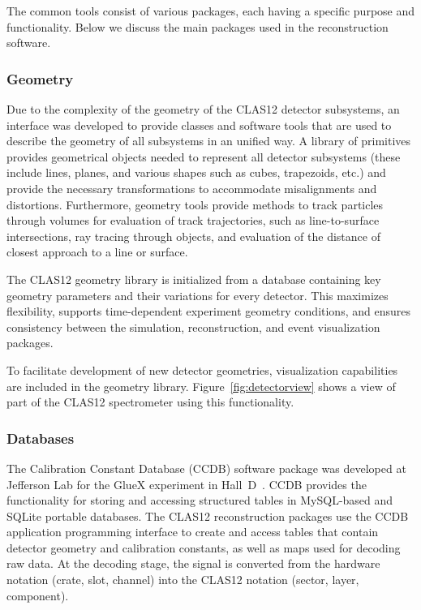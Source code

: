 The common tools consist of various packages, each having a specific purpose and functionality. Below we discuss
the main packages used in the reconstruction software.

\subsubsection{Geometry}

Due to the complexity of the geometry of the CLAS12 detector subsystems, an interface was developed to provide
classes and software tools that are used to describe the geometry of all subsystems in an unified way.  A library of
primitives provides geometrical objects needed to represent all detector subsystems (these include lines, planes,
and various shapes such as cubes, trapezoids, etc.) and provide the necessary transformations to accommodate
misalignments and distortions.  Furthermore, geometry tools provide methods to track particles through volumes for
evaluation of track trajectories, such as line-to-surface intersections, ray tracing through objects, and evaluation of
the distance of closest approach to a line or surface.

The CLAS12 geometry library is initialized from a database containing key geometry parameters and their
variations for every detector.  This maximizes flexibility, supports time-dependent experiment geometry
conditions, and ensures consistency between the simulation, reconstruction, and event visualization packages.

To facilitate development of new detector geometries, visualization capabilities are included in the geometry library.
Figure~\ref{fig:detectorview} shows a view of part of the CLAS12 spectrometer using this functionality.

\subsubsection{Databases}

The Calibration Constant Database (CCDB) software package was developed at Jefferson Lab for the GlueX
experiment in Hall~D~\cite{gluex}.  CCDB provides the functionality for storing and accessing structured tables in
MySQL-based and SQLite portable databases. The CLAS12 reconstruction packages use the CCDB application
programming interface to create and access tables that contain detector geometry and calibration constants, as
well as maps used for decoding raw data. At the decoding stage, the signal is converted from the hardware notation
(crate, slot, channel) into the CLAS12 notation (sector, layer, component). 

